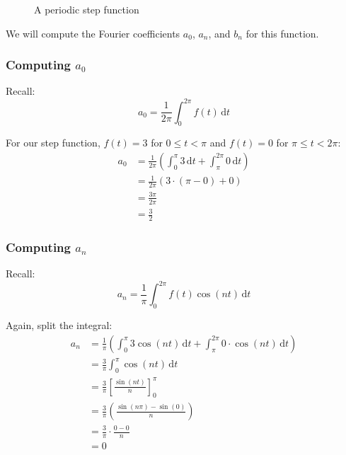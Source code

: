 \documentclass[10pt]{article} %
\begin{document}
\begin{figure}[h!]
    \caption{A periodic step function} %
    \label{fig:periodic_step_function} %
\end{figure}

We will compute the Fourier coefficients $a_0$, $a_n$, and $b_n$ for this function.

\subsubsection{Computing $a_0$}

Recall:
\[
a_0 = \frac{1}{2\pi}\int_0^{2\pi} f(t)\,\mathrm{d}t
\]

For our step function, $f(t) = 3$ for $0 \leq t < \pi$ and $f(t) = 0$ for $\pi \leq t < 2\pi$:
\begin{align*}
a_0 &= \frac{1}{2\pi} \left( \int_0^{\pi} 3\,\mathrm{d}t + \int_{\pi}^{2\pi} 0\,\mathrm{d}t \right) \\
    &= \frac{1}{2\pi} \left( 3\cdot (\pi - 0) + 0 \right) \\
    &= \frac{3\pi}{2\pi}\\
    &= \frac32
\end{align*}

\subsubsection{Computing $a_n$}

Recall:
\[
a_n = \frac{1}{\pi}\int_0^{2\pi} f(t)\cos(nt)\,\mathrm{d}t
\]

Again, split the integral:
\begin{align*}
a_n &= \frac{1}{\pi} \left( \int_0^{\pi} 3\cos(nt)\,\mathrm{d}t + \int_{\pi}^{2\pi} 0\cdot\cos(nt)\,\mathrm{d}t \right) \\
    &= \frac{3}{\pi} \int_0^{\pi} \cos(nt)\,\mathrm{d}t \\
    &= \frac{3}{\pi} \left[ \frac{\sin(nt)}{n} \right]_0^{\pi} \\
    &= \frac{3}{\pi} \left( \frac{\sin(n\pi) - \sin(0)}{n} \right) \\
    &= \frac{3}{\pi} \cdot \frac{0 - 0}{n} \\
    &= 0
\end{align*}
\end{document}
